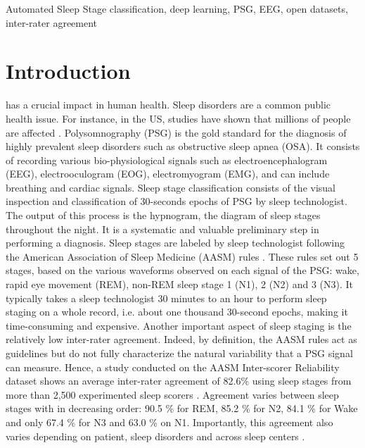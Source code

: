 \documentclass[journal]{IEEEtran}
\begin{document}
\begin{IEEEkeywords}
Automated Sleep Stage classification, deep learning, PSG, EEG, open datasets, inter-rater agreement
\end{IEEEkeywords}






\IEEEpeerreviewmaketitle

\section{Introduction}


 has a crucial impact in human health. Sleep disorders are a common public health issue. For instance, in the US, studies have shown that millions of people are affected  \cite{NationalCenteronSleepDisordersResearchandothers2011NationalPlan}. Polysomnography (PSG) is the gold standard for the diagnosis of highly prevalent sleep disorders such as obstructive sleep apnea (OSA). It consists of recording various bio-physiological signals such as electroencephalogram (EEG), electrooculogram (EOG), electromyogram (EMG), and can include breathing and cardiac signals. Sleep stage classification consists of the visual inspection and classification of 30-seconds epochs of PSG by sleep technologist. The output of this process is the hypnogram, the diagram of sleep stages throughout the night. It is a systematic and valuable preliminary step in performing a diagnosis. Sleep stages are labeled by sleep technologist following the American Association of Sleep Medicine (AASM) rules \cite{Iber2007TheSpecifications}. These rules set out 5 stages, based on the various waveforms observed on each signal of the PSG: wake, rapid eye movement (REM), non-REM sleep stage 1 (N1), 2 (N2) and 3 (N3). It typically takes a sleep technologist 30 minutes to an hour to perform sleep staging on a whole record, i.e. about one thousand 30-second epochs, making it time-consuming and expensive. Another important aspect of sleep staging is the relatively low inter-rater agreement. Indeed, by definition, the AASM rules act as guidelines but do not fully characterize the natural variability that a PSG signal can measure. Hence, a study conducted on the AASM Inter-scorer Reliability dataset shows an average inter-rater agreement of 82.6\% using sleep stages from more than 2,500 experimented sleep scorers \cite{Rosenberg2014TheEvents}. Agreement varies between sleep stages with in decreasing order: 90.5 \% for REM, 85.2 \% for N2, 84.1 \% for Wake and only 67.4 \% for N3 and 63.0 \% on N1. Importantly, this agreement also varies depending on patient, sleep disorders and across sleep centers \cite{Danker-Hopfe2009InterraterStandard} \cite{Rosenberg2014TheEvents}.
\end{document}
